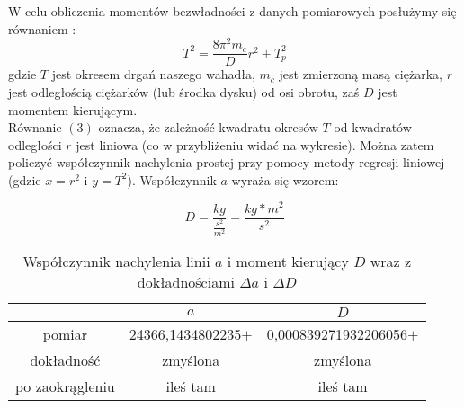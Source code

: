\documentclass[10pt,a4paper]{article}
\newcommand{\forceindent}{\leavevmode{\parindent=3em\indent}}
\begin{document}
\forceindent W celu obliczenia momentów bezwładności z danych pomiarowych posłużymy się równaniem :
\begin{equation}
T^2 = \frac{8 \pi^2 m_c}{D}r^2 + T_p^2
\end{equation}
gdzie $T$ jest okresem drgań naszego wahadła, $m_c$ jest zmierzoną masą ciężarka, $r$ jest odległością ciężarków (lub środka dysku) od osi obrotu, zaś $D$ jest momentem kierującym.\\
\forceindent Równanie $(3)$ oznacza, że zależność kwadratu okresów $T$ od kwadratów odległości $r$ jest liniowa (co w przybliżeniu widać na wykresie). Można zatem policzyć współczynnik nachylenia prostej przy pomocy metody regresji liniowej (gdzie $x = r^2$ i $y = T^2$). Współczynnik $a$ wyraża się wzorem:


$$
D=\frac{kg}{\frac{s^2}{m^2}}=\frac{kg*m^2}{s^2}
$$

\begin{table}[!h]
\centering
\begin{tabular}{|cc||c|}
\multicolumn{1}{c}{} & \multicolumn{1}{c}{$a$} & \multicolumn{1}{c}{$D$}\\
\hline
pomiar & 24366,1434802235$\pm$& 0,000839271932206056$\pm$\\
\hline
dokładność & zmyślona & zmyślona\\
\hline
po zaokrągleniu & ileś tam  & ileś tam \\
\hline
\end{tabular}
\caption{Współczynnik nachylenia linii $a$ i moment kierujący $D$ wraz z dokładnościami $\Delta a$ i $\Delta D$}
\end{table}
\end{document}
